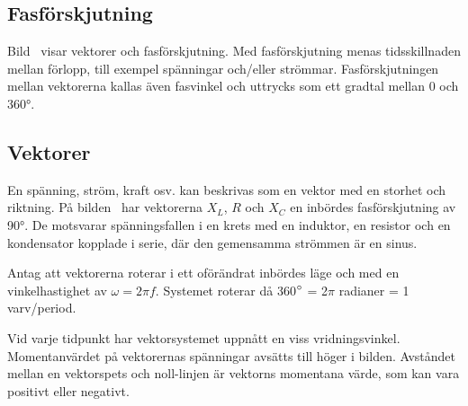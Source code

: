 \subsection{Fasförskjutning}


Bild~ visar vektorer och fasförskjutning.
Med fasförskjutning menas tidsskillnaden mellan förlopp, till exempel spänningar
och/eller strömmar.
Fasförskjutningen mellan vektorerna kallas även fasvinkel och uttrycks som ett
gradtal mellan 0 och \ang{360}.

\subsection{Vektorer}

En spänning, ström, kraft osv. kan beskrivas som en vektor med en storhet och
riktning.
På bilden~ har vektorerna \(X_L\), \(R\) och \(X_C\) en
inbördes fasförskjutning av \ang{90}.
De motsvarar spänningsfallen i en krets med en induktor, en resistor och en
kondensator kopplade i serie, där den gemensamma strömmen är en sinus.

Antag att vektorerna roterar i ett oförändrat inbördes läge och med en
vinkelhastighet av \(\omega= 2\pi f\).
Systemet roterar då 360\(\degree\) = 2\(\pi\) radianer = 1 varv/per\-iod.

Vid varje tidpunkt har vektorsystemet uppnått en viss vridningsvinkel.
Momentanvärdet på vektorernas spänningar avsätts till höger i bilden.
Avståndet mellan en vektorspets och noll-linjen är vektorns momentana värde,
som kan vara positivt eller negativt.

